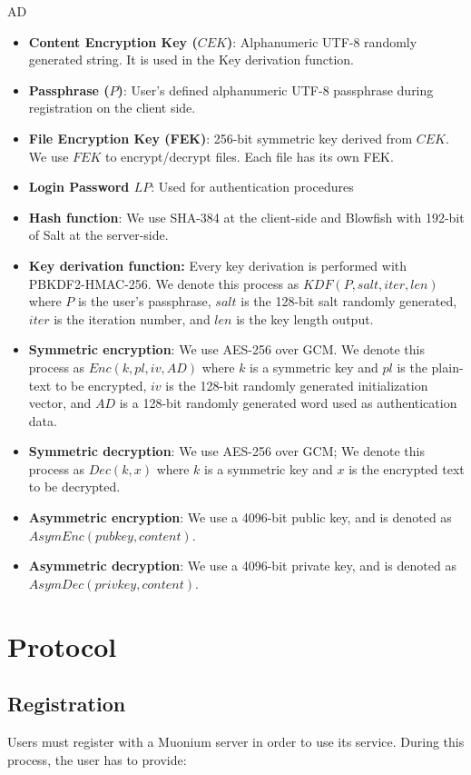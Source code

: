 AD\documentclass[a4paper,10pt]{article}
\begin{document}
\begin{itemize}
    \item \textbf{Content Encryption Key ($CEK$)}:
        Alphanumeric UTF-8 randomly generated string. It is used in the Key derivation function.
    \item \textbf{Passphrase ($P$)}:
        User's defined alphanumeric UTF-8 passphrase during registration on the client side.
    \item \textbf{File Encryption Key (FEK)}:
        256-bit symmetric key derived from $CEK$. We use $FEK$ to encrypt/decrypt files. Each file has its own FEK.
    \item \textbf{Login Password $LP$}: Used for authentication procedures
    \item \textbf{Hash function}: We use SHA-384 at the client-side and Blowfish with 192-bit of Salt at the server-side.
    \item \textbf{Key derivation function:} Every key derivation is performed with PBKDF2-HMAC-256. We denote this process as
		$KDF(P,salt, iter, len)$ where $P$ is the user's passphrase, $salt$ is the 128-bit salt randomly generated, $iter$ is the
		iteration number, and $len$ is the key length output.
    \item \textbf{Symmetric encryption}: We use AES-256 over GCM.
        We denote this process as $Enc(k,pl, iv, AD)$ where $k$ is a symmetric key and $pl$ is the plain-text to be encrypted,
				$iv$ is the 128-bit randomly generated initialization vector, and $AD$ is a 128-bit randomly generated word used as
				authentication data.
    \item \textbf{Symmetric decryption}: We use AES-256 over GCM;
        We denote this process as $Dec(k, x)$ where $k$ is a symmetric key and $x$ is the encrypted text to be decrypted.
		\item \textbf{Asymmetric encryption}: We use a 4096-bit public key, and is denoted as $AsymEnc(pubkey, content)$.
		\item \textbf{Asymmetric decryption}: We use a 4096-bit private key, and is denoted as $AsymDec(privkey, content)$.
\end{itemize}

\section{Protocol}
\subsection{Registration}
Users must register with a Muonium server in order to use its service. During this process, the user has to provide:
\end{document}
